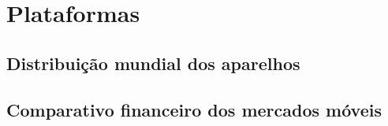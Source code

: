 
\chapter{Plataformas}
\label{cap:plataformas}


\section{Distribuição mundial dos aparelhos}


\section{Comparativo financeiro dos mercados móveis}




